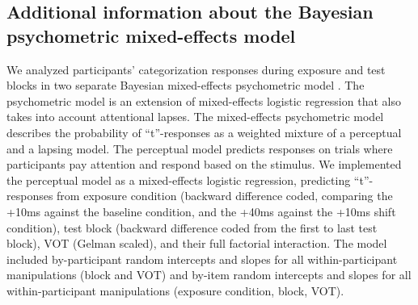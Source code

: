 \documentclass[
  11pt,
  man,mask,floatsintext]{apa6}
\begin{document}
\subsection{Additional information about the Bayesian psychometric mixed-effects model}\label{sec:analysis-approach}

We analyzed participants' categorization responses during exposure and test blocks in two separate Bayesian mixed-effects psychometric model \autocite{kuss2005,prins2011,prins2019,schutt2015}. The psychometric model is an extension of mixed-effects logistic regression that also takes into account attentional lapses. The mixed-effects psychometric model describes the probability of ``t''-responses as a weighted mixture of a perceptual and a lapsing model. The perceptual model predicts responses on trials where participants pay attention and respond based on the stimulus. We implemented the perceptual model as a mixed-effects logistic regression, predicting ``t''-responses from exposure condition (backward difference coded, comparing the +10ms against the baseline condition, and the +40ms against the +10ms shift condition), test block (backward difference coded from the first to last test block), VOT (Gelman scaled), and their full factorial interaction. The model included by-participant random intercepts and slopes for all within-participant manipulations (block and VOT) and by-item random intercepts and slopes for all within-participant manipulations (exposure condition, block, VOT).
\end{document}
